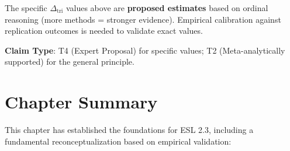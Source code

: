 \documentclass[11pt,a4paper]{article}
\begin{document}
\begin{warningbox}[title={Validation Status}]
The specific $\Delta_{\text{tri}}$ values above are \textbf{proposed estimates} based on ordinal reasoning (more methods = stronger evidence). Empirical calibration against replication outcomes is needed to validate exact values.

\textbf{Claim Type}: T4 (Expert Proposal) for specific values; T2 (Meta-analytically supported) for the general principle.
\end{warningbox}


\section{Chapter Summary}
\label{sec:chapter-summary}

This chapter has established the foundations for ESL 2.3, including a fundamental reconceptualization based on empirical validation:
\end{document}

